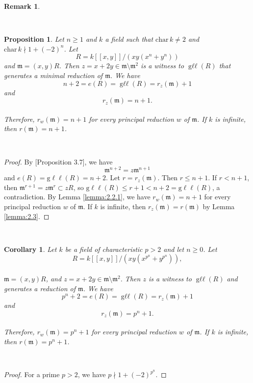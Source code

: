 \documentclass{amsart}
\newtheorem{proposition}[theorem]{Proposition}
\newtheorem{corollary}[theorem]{Corollary}
\theoremstyle{definition}
\theoremstyle{definition}
\newtheorem{remark}[theorem]{Remark}
\numberwithin{equation}{section}
\theoremstyle{definition}
\DeclareMathOperator{\Gll}{g\ell\ell}
\begin{document}
{\begin{remark}
\end{remark}
\text{}\\
\begin{proposition}\label{prop:2.3}
Let $n \geq 1$ and $k$ a field such that $\text{char}\, k \neq 2$ and $\text{char}\,k \nmid 1 + (-2)^n$. Let 
\[
R=k[[x,y]]\bigg/\left(xy\left(x^n + y^n \right) \right)
\] and $\mathfrak{m}=(x,y)R$. Then $z=x+2y \in \mathfrak{m} \setminus \mathfrak{m}^2$ is a witness to $\Gll(R)$ that generates a minimal reduction of $\mathfrak{m}$. We have \\
\[
n+2=e(R)=\Gll(R)=r_{z}(\mathfrak{m}) +1
\] and 
\[
r_{z}(\mathfrak{m})=n+1.
\] \text{}\\ Therefore, $r_{w}(\mathfrak{m})=n+1$ for every principal reduction $w$ of $\mathfrak{m}$. If $k$ is infinite, then $r(\mathfrak{m})=n+1$.
\end{proposition}
\text{}\\
\begin{proof}
By \cite{Bartels24}[Proposition 3.7], we have 
\[
\mathfrak{m}^{n+2}=z\mathfrak{m}^{n+1}
\]
and $e(R)=\text{g}\ell\ell(R)=n+2$. Let $r=r_{z}(\mathfrak{m})$. Then $r \leq n+1$. If $r < n+1$, then $\mathfrak{m}^{r +1}=z\mathfrak{m}^{r} \subset zR$, so $\text{g}\ell\ell(R) \leq r +1<n+2=\text{g}\ell\ell(R)$, a contradiction. By Lemma \ref{lemma:2.2.1}, we have $r_{w}(\mathfrak{m})=n+1$ for every principal reduction $w$ of $\mathfrak{m}$. If $k$ is infinite, then $r_{z}(\mathfrak{m})=r(\mathfrak{m})$ by Lemma \ref{lemma:2.3}.  
\end{proof} \text{}\\
\begin{corollary}\label{corollary:2.6}
Let $k$ be a field of characteristic $p>2$ and let $n \geq 0$. Let \\
\[
R=k[[x,y]] \bigg/\left(xy\left(x^{p^n} + y^{p^n} \right) \right),
\] \text{}\\ $\mathfrak{m}=(x,y)R$, and $z=x+2y \in \mathfrak{m} \setminus \mathfrak{m}^2$. Then $z$ is a witness to $\Gll(R)$ and generates a reduction of $\mathfrak{m}$. We have \\
\[
p^n + 2 = e(R)=\Gll(R)=r_{z}(\mathfrak{m}) + 1
\] and 
\[
r_{z}(\mathfrak{m})=p^n + 1.
\] \text{}\\ Therefore, $r_{w}(\mathfrak{m})=p^n+1$ for every principal reduction $w$ of $\mathfrak{m}$. If $k$ is infinite, then $r(\mathfrak{m})=p^n + 1$.
\end{corollary}
\text{}\\
\begin{proof}
For a prime $p>2$, we have $p \nmid 1 + (-2)^{p^n}$.

\end{proof}}
\end{document}
